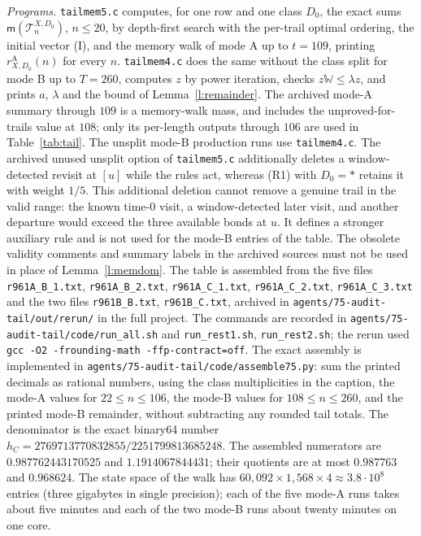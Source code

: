 \emph{Programs.} \texttt{tailmem5.c} computes, for one row and one class $D_0$, the exact sums $\mathsf m(\mathcal T^{X, D_0}_n)$, $n \le 20$, by depth-first search with the per-trail optimal ordering, the initial vector (I), and the memory walk of mode A up to $t = 109$, printing $r^{\mathrm A}_{X, D_0}(n)$ for every $n$. \texttt{tailmem4.c} does the same without the class split for mode B up to $T = 260$, computes $z$ by power iteration, checks $z \mathbb W \le \lambda z$, and prints $a$, $\lambda$ and the bound of Lemma~\ref{l:remainder}.
The archived mode-A summary through $109$ is a memory-walk mass, and includes the unproved-for-trails value at $108$; only its per-length outputs through $106$ are used in Table~\ref{tab:tail}.
The unsplit mode-B production runs use \texttt{tailmem4.c}.
The archived unused unsplit option of \texttt{tailmem5.c} additionally deletes a window-detected revisit at $[u]$ while the rules act, whereas (R1) with $D_0=\ast$ retains it with weight $1/5$.
This additional deletion cannot remove a genuine trail in the valid range: the known time-$0$ visit, a window-detected later visit, and another departure would exceed the three available bonds at $u$.
It defines a stronger auxiliary rule and is not used for the mode-B entries of the table.
The obsolete validity comments and summary labels in the archived sources must not be used in place of Lemma~\ref{l:memdom}. The table is assembled from the five files
\texttt{r961A\_B\_1.txt}, \texttt{r961A\_B\_2.txt},
\texttt{r961A\_C\_1.txt}, \texttt{r961A\_C\_2.txt},
\texttt{r961A\_C\_3.txt} and the two files
\texttt{r961B\_B.txt}, \texttt{r961B\_C.txt}, archived in
\texttt{agents/75-audit-tail/out/rerun/} in the full project.
The commands are recorded in \texttt{agents/75-audit-tail/code/run\_all.sh}
and \texttt{run\_rest1.sh}, \texttt{run\_rest2.sh}; the rerun used
\texttt{gcc -O2 -frounding-math -ffp-contract=off}.
The exact assembly is implemented in \texttt{agents/75-audit-tail/code/assemble75.py}:
sum the printed decimals as rational numbers, using the class multiplicities in the caption,
the mode-A values for $22\le n\le106$, the mode-B values for $108\le n\le260$,
and the printed mode-B remainder, without subtracting any rounded tail totals.
The denominator is the exact binary64 number $h_C=2769713770832855/2251799813685248$.
The assembled numerators are $0.987762443170525$ and $1.1914067844431$;
their quotients are at most $0.987763$ and $0.968624$. The state space of the walk has $60{,}092 \times 1{,}568 \times 4 \approx 3.8 \cdot 10^8$ entries (three gigabytes in single precision); each of the five mode-A runs takes about five minutes and each of the two mode-B runs about twenty minutes on one core.

